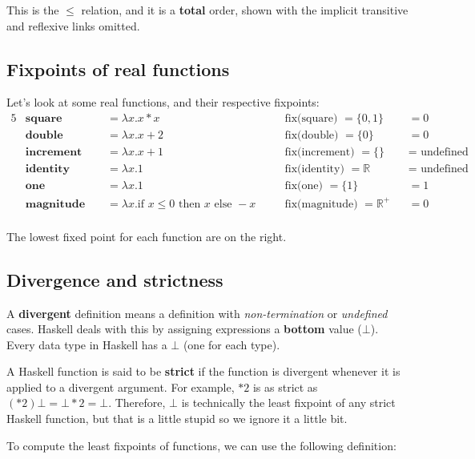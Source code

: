 \documentclass[11pt,a4paper,headsepline,titlepage,dvipsnames,cmyk]{scrartcl}
\begin{document}
This is the $\le$ relation, and it is a \textbf{total} order, shown with the
implicit transitive and reflexive links omitted.

\subsection{Fixpoints of real functions}%
\label{sub:real-fixpoints}
Let's look at some real functions, and their respective fixpoints:
\begin{alignat*}{5}
    &\textbf{square } &&= \lambda x . x*x &&\text{fix(square) } = \{0,1\}
    &&= 0\\
    &\textbf{double } &&= \lambda x . x+2 &&\text{fix(double) } = \{0\} &&= 0\\
    &\textbf{increment } &&= \lambda x.x+1 &&\text{fix(increment) } = \{\} &&=
    \text{ undefined }\\
    &\textbf{identity } &&= \lambda x . 1 &&\text{fix(identity) } =
    \mathbb{R} &&= \text{ undefined }\\
               &\textbf{one } &&= \lambda x . 1 &&\text{fix(one) } =
    \{1\} &&= 1\\
               &\textbf{magnitude } &&= \lambda x . \text{if } x \le 0 \text{ then } x
    \text{ else } -x \quad &&\text{fix(magnitude) } = \mathbb{R}^+ &&= 0\\
\end{alignat*}

The lowest fixed point for each function are on the right.

\subsection{Divergence and strictness}%
\label{sub:divergence-strictness}
A \textbf{divergent} definition means a definition with
\textit{non-termination} or \textit{undefined} cases. Haskell deals with
this by assigning expressions a \textbf{bottom} value ($\bot$). Every data
type in Haskell has a $\bot$ (one for each type).

A Haskell function is said to be \textbf{strict} if the function is
divergent whenever it is applied to a divergent argument. For example,
$*2$ is as strict as $(*2) \bot = \bot * 2 = \bot$. Therefore, $\bot$ is
technically the least fixpoint of any strict Haskell function, but that is
a little stupid so we ignore it a little bit.

To compute the least fixpoints of functions, we can use the following
definition:
\end{document}
